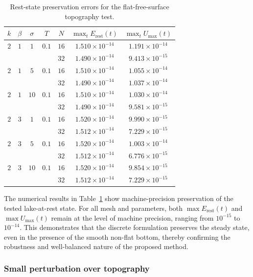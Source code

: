 \documentclass[pdflatex,sn-mathphys-num]{sn-jnl}%
\theoremstyle{thmstyleone}%
\theoremstyle{thmstyletwo}%
\theoremstyle{thmstylethree}%
\begin{document}
\begin{table}[htbp]
\centering
\caption{Rest-state preservation errors for the flat-free-surface topography test.}
\label{tab6}
\begin{tabular}{ccccccc}
\toprule
$k$ & $\beta$ & $\sigma$ & $T$ & $N$ & $\max_t E_{\mathrm{rest}}(t)$ & $\max_t U_{\max}(t)$ \\
\midrule
 $2$ & $1$ & $1$ & $0.1$ & $16$ & $1.510 \times 10^{-14}$ & $1.191 \times 10^{-14}$ \\
 &  &  &  & $32$ & $1.490 \times 10^{-14}$ & $9.413\times 10^{-15}$ \\
$2$ & $1$ & $5$ & $0.1$ & $16$ & $1.510 \times 10^{-14}$ & $1.055 \times 10^{-14}$ \\
 &  &  &  & $32$ & $1.490 \times 10^{-14}$ & $1.037\times 10^{-14}$ \\
 $2$ & $1$ & $10$ & $0.1$ & $16$ & $1.510 \times 10^{-14}$ & $1.030 \times 10^{-14}$ \\
 &  &  &  & $32$ & $1.490 \times 10^{-14}$ & $9.581\times 10^{-15}$ \\
 $2$ & $3$ & $1$ & $0.1$ & $16$ & $1.520 \times 10^{-14}$ & $9.990 \times 10^{-15}$ \\
 &  &  &  & $32$ & $1.512 \times 10^{-14}$ & $7.229\times 10^{-15}$ \\
 $2$ & $3$ & $5$ & $0.1$ & $16$ & $1.520 \times 10^{-14}$ & $1.003 \times 10^{-14}$ \\
 &  &  &  & $32$ & $1.512 \times 10^{-14}$ & $6.776\times 10^{-15}$ \\
 $2$ & $3$ & $10$ & $0.1$ & $16$ & $1.520 \times 10^{-14}$ & $9.854 \times 10^{-15}$ \\
 &  &  & & $32$ & $1.512 \times 10^{-14}$ & $7.229 \times 10^{-15}$ \\
\bottomrule
\end{tabular}
\end{table}

The numerical results in Table~\ref{tab6} show machine-precision preservation of the tested lake-at-rest state. For all mesh and parameters, both $\max E_{\mathrm{rest}}(t)$ and $\max U_{\max}(t)$ remain at the level of machine precision, ranging from $10^{-15}$ to $10^{-14}$. This demonstrates that the discrete formulation preserves the steady state, even in the presence of the smooth non-flat bottom, thereby confirming the robustness and well-balanced nature of the proposed method.

\subsubsection{Small perturbation over topography}
\end{document}
